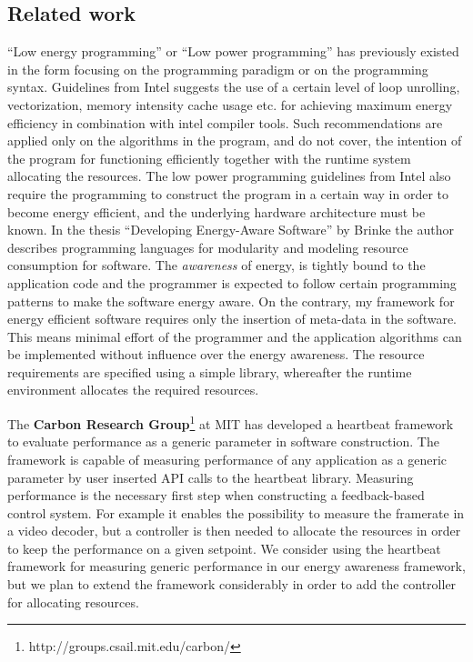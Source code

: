 \documentclass{article}
\begin{document}
\subsection{Related work}
``Low energy programming'' or ``Low power programming'' has previously existed in the form focusing on the programming paradigm or on the programming syntax. 
Guidelines from Intel \cite{IntelLowPower} suggests the use of a certain level of loop unrolling, vectorization, memory intensity cache usage etc.
for achieving maximum energy efficiency in combination with intel compiler tools. 
Such recommendations are applied only on the algorithms in the program, and do not cover, the intention of the program for functioning efficiently together with the runtime system allocating the resources. 
The low power programming guidelines from Intel also require the programming to construct the program in a certain way in order to become energy efficient, 
and the underlying hardware architecture must be known. 
In the thesis ``Developing Energy-Aware Software'' by Brinke \cite{Brinke:15} the author describes programming languages for modularity and modeling resource consumption for software.
The \textit{awareness} of energy, is tightly bound to the application code and the programmer is expected to follow certain programming patterns to make the software energy aware.
On the contrary, my framework for energy efficient software requires only the insertion of meta-data in the software.
This means minimal effort of the programmer and the application algorithms can be implemented without influence over the energy awareness.
The resource requirements are specified using a simple library, whereafter the runtime environment allocates the required resources.

The \textbf{Carbon Research Group}\footnote{http://groups.csail.mit.edu/carbon/} at MIT has developed a heartbeat framework to evaluate performance as a generic parameter in software construction. The framework is capable of measuring performance of any application as a generic parameter by user inserted API calls to the heartbeat library. Measuring performance is the necessary first step when constructing a feedback-based control system. For example it enables the possibility to measure the framerate in a video decoder, but a controller is then needed to allocate the resources in order to keep the performance on a given setpoint. We consider using the heartbeat framework for measuring generic performance in our energy awareness framework, but we plan to extend the framework considerably in order to add the controller for allocating resources.\\
\end{document}
